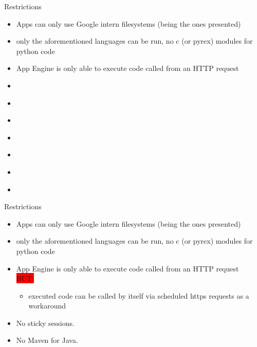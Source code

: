 \documentclass{beamer}
\begin{document}
\begin{frame}{Restrictions}
	\begin{itemize}
		\item Apps can only use  Google intern filesystems (being the ones presented)
		\item only the aforementioned languages can be run, no c (or pyrex) modules for python code
		\item App Engine is only able to execute code called from an HTTP request\\
				\item \   
		\item \ 
		\item \ 
		\item \ 
				\item \ 
		\item \ 
		\item \ 
	
\end{itemize}
\end{frame}
\begin{frame}{Restrictions}
	\begin{itemize}
		\item Apps can only use  Google intern filesystems (being the ones presented)
		\item only the aforementioned languages can be run, no c (or pyrex) modules for python code
		\item App Engine is only able to execute code called from an HTTP request\\
	\colorbox{red}{BUT:}
		
		\begin{itemize}
			\item executed code can be called by itself via scheduled https requests as a workaround  
		\end{itemize}
	
		\item No sticky sessions.  
	\item No Maven for Java. 
		

	\end{itemize}
\end{frame}
\end{document}
